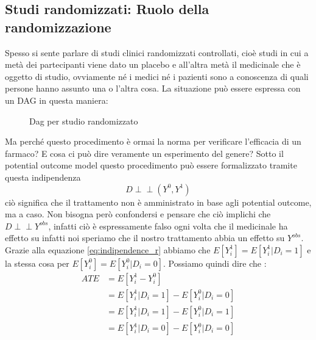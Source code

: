 \documentclass{article}
\begin{document}
\subsection{Studi randomizzati: Ruolo della randomizzazione}
Spesso si sente parlare di studi clinici randomizzati controllati, cioè studi in cui a metà dei partecipanti viene dato un placebo e all'altra metà il medicinale che è oggetto di studio, ovviamente né i medici né i pazienti sono a conoscenza di quali persone hanno assunto una o l'altra cosa. La situazione può essere espressa con un DAG in questa maniera: 
\begin{figure}[H]
\centering
\caption{Dag per studio randomizzato}
\label{fig:dag_random_EX}
\end{figure}
Ma perché questo procedimento è ormai la norma per verificare l'efficacia di un farmaco? E cosa ci può dire veramente un esperimento del genere? Sotto il potential outcome model questo procedimento può essere formalizzato tramite questa indipendenza
\begin{equation}
D \perp\!\!\!\perp (Y^{0},Y^{1})
\label{eq:indipendence_r}
\end{equation}
ciò significa che il trattamento non è amministrato in base agli potential outcome, ma a caso. Non bisogna però confondersi e pensare che ciò implichi che $D \perp\!\!\!\perp Y^{obs}$, infatti ciò è espressamente falso ogni volta che il medicinale ha effetto su infatti noi speriamo che il nostro trattamento abbia un effetto su $Y^{obs}$.
Grazie alla equazione \ref{eq:indipendence_r} abbiamo che $E[Y^1_i] = E[Y^{1}_i | D_i = 1]  $ e la stessa cosa per $E[Y^0_i] = E[Y^{0}_i | D_i = 0] $.
Possiamo quindi dire che :
\begin{align}
ATE &= E[Y^1_i-Y^0_i ] \\ 
 &= E[Y^{1}_i | D_i = 1]- E[Y^{0}_i | D_i = 0]\label{eq:ATE_R} \\
	& =E[Y^{1}_i | D_i = 1]- E[Y^{0}_i | D_i = 1] \label{eq:ATT_R} \\
 &= E[Y^{1}_i | D_i = 0]- E[Y^{0}_i | D_i = 0] \label{eq:ATU_R}
  \end{align}
\end{document}

